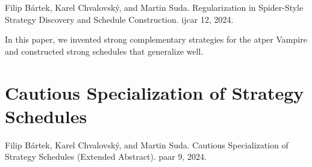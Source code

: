 Filip Bártek, Karel Chvalovský, and Martin Suda.
Regularization in Spider-Style Strategy Discovery and Schedule Construction.
\Acrlong{ijcar} 12, 2024.
\cite{DBLP:conf/ijcar/BartekCS24}

In this paper, we invented strong complementary strategies for the \gls{atper} Vampire and constructed strong schedules that generalize well.


\section{Cautious Specialization of Strategy Schedules}
\label{sec:results:cautious}

Filip Bártek, Karel Chvalovský, and Martin Suda.
Cautious Specialization of Strategy Schedules (Extended Abstract).
\Acrlong{paar} 9, 2024.
\cite{DBLP:conf/paar/BartekC024}

